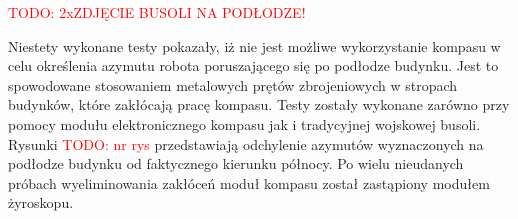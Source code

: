\textcolor{red}{TODO: 2xZDJĘCIE BUSOLI NA PODŁODZE!}

Niestety wykonane testy pokazały, iż nie jest możliwe wykorzystanie kompasu w celu określenia azymutu robota poruszającego się po podłodze budynku. Jest to spowodowane stosowaniem metalowych prętów zbrojeniowych w stropach budynków, które zakłócają pracę kompasu. Testy zostały wykonane zarówno przy pomocy modułu elektronicznego kompasu jak i tradycyjnej wojskowej busoli. Rysunki \textcolor{red}{TODO: nr rys} przedstawiają odchylenie azymutów wyznaczonych na podłodze budynku od faktycznego kierunku północy. Po wielu nieudanych próbach wyeliminowania zakłóceń moduł kompasu został zastąpiony modułem żyroskopu.

